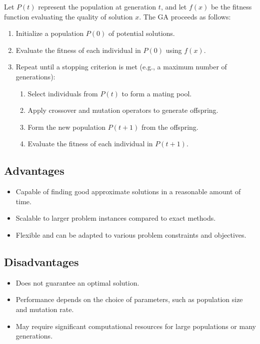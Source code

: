 \documentclass[a4paper,12pt]{report}
\begin{document}
Let $P(t)$ represent the population at generation $t$, and let $f(x)$ be the fitness function evaluating the quality of solution $x$. The GA proceeds as follows:
\begin{enumerate}
    \item Initialize a population $P(0)$ of potential solutions.
    \item Evaluate the fitness of each individual in $P(0)$ using $f(x)$.
    \item Repeat until a stopping criterion is met (e.g., a maximum number of generations):
    \begin{enumerate}
        \item Select individuals from $P(t)$ to form a mating pool.
        \item Apply crossover and mutation operators to generate offspring.
        \item Form the new population $P(t+1)$ from the offspring.
        \item Evaluate the fitness of each individual in $P(t+1)$.
    \end{enumerate}
\end{enumerate}

\subsection{Advantages}
\begin{itemize}
    \item Capable of finding good approximate solutions in a reasonable amount of time.
    \item Scalable to larger problem instances compared to exact methods.
    \item Flexible and can be adapted to various problem constraints and objectives.
\end{itemize}

\subsection{Disadvantages}
\begin{itemize}
    \item Does not guarantee an optimal solution.
    \item Performance depends on the choice of parameters, such as population size and mutation rate.
    \item May require significant computational resources for large populations or many generations.
\end{itemize}
\end{document}
